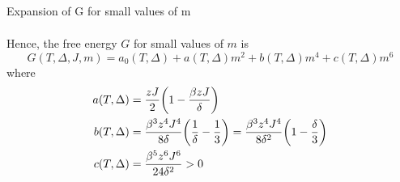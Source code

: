 \documentclass[../../Main/Main.tex]{subfiles}
\begin{document}
\begin{exercise}{Expansion of G for small values of m }{}
\begin{solution}
\begin{equation*}
\begin{split}
\end{split}
\end{equation*}
Hence, the free energy \(G\) for small values of \(m\) is 
\begin{equation*}
  G (T, \Delta , J, m) = a_0 (T,\Delta ) + a(T, \Delta )m^2 + b (T, \Delta ) m^4 + c(T, \Delta )m^6
\end{equation*}
where
\begin{subequations}
\begin{align*}
  a(T,\Delta ) &= \frac{z J}{2} \qty(1 - \frac{\beta z J}{\delta })   \\
  b(T,\Delta ) &= \frac{\beta ^3 z^4 J^4}{8 \delta } \qty(\frac{1}{\delta } - \frac{1}{3}) = \frac{\beta ^3 z^4 J^4}{8 \delta^2 } \qty(1 - \frac{\delta }{3})    \\
  c(T,\Delta ) &= \frac{\beta ^5 z^6 J^6}{24 \delta^2 } > 0
\end{align*}
\end{subequations}
\end{solution}

\end{exercise}
\end{document}
